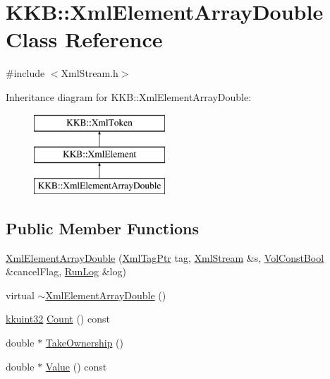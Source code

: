 \hypertarget{class_k_k_b_1_1_xml_element_array_double}{}\section{K\+KB\+:\+:Xml\+Element\+Array\+Double Class Reference}
\label{class_k_k_b_1_1_xml_element_array_double}


{\ttfamily \#include $<$Xml\+Stream.\+h$>$}

Inheritance diagram for K\+KB\+:\+:Xml\+Element\+Array\+Double\+:\begin{figure}[H]
\begin{center}
\leavevmode
\includegraphics[height=3.000000cm]{class_k_k_b_1_1_xml_element_array_double}
\end{center}
\end{figure}
\subsection*{Public Member Functions}
\begin{DoxyCompactItemize}
\item 
\hyperlink{class_k_k_b_1_1_xml_element_array_double_ae36ba05ec0a3a1a4ba18ba06316e1aa5}{Xml\+Element\+Array\+Double} (\hyperlink{namespace_k_k_b_a9253a3ea8a5da18ca82be4ca2b390ef0}{Xml\+Tag\+Ptr} tag, \hyperlink{class_k_k_b_1_1_xml_stream}{Xml\+Stream} \&s, \hyperlink{namespace_k_k_b_a7d390f568e2831fb76b86b56c87bf92f}{Vol\+Const\+Bool} \&cancel\+Flag, \hyperlink{class_k_k_b_1_1_run_log}{Run\+Log} \&log)
\item 
virtual \hyperlink{class_k_k_b_1_1_xml_element_array_double_a82258967fa3c5dea7f92b4e071f205e4}{$\sim$\+Xml\+Element\+Array\+Double} ()
\item 
\hyperlink{namespace_k_k_b_af8d832f05c54994a1cce25bd5743e19a}{kkuint32} \hyperlink{class_k_k_b_1_1_xml_element_array_double_a591f50d85eadd680d84febde51f26350}{Count} () const 
\item 
double $\ast$ \hyperlink{class_k_k_b_1_1_xml_element_array_double_a7ea0ba2abb1599a06ff7ff363ff56f19}{Take\+Ownership} ()
\item 
double $\ast$ \hyperlink{class_k_k_b_1_1_xml_element_array_double_afeb69565542e41186a390fddf9cfdc9c}{Value} () const 
\end{DoxyCompactItemize}
